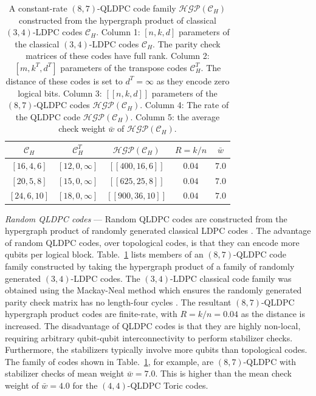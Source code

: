 \documentclass[%
 reprint,
superscriptaddress,
nofootinbib,
 amsmath,amssymb,
secnumarabic
]{revtex4-1}
\begin{document}
\begin{table} 
\renewcommand{\arraystretch}{1.2}

\begin{tabular}{c c | c c c}
	$\mathcal{C}_H$ & $\mathcal{C}_H^T$& $\mathcal{HGP}(\mathcal{C}_H)$ & $R=k/n$ & $\bar{w}$ \\ \hline
	$[16,4,6]$  & $[12,0,\infty]$ & $[[400,16,6]]$ & $0.04$ & $7.0$\\
	$[20,5,8]$  & $[15,0,\infty]$ & $[[625,25,8]]$ & $ 0.04$ & $7.0$\\
	$[24,6,10]$ & $[18,0,\infty]$ & $[[900,36,10]]$ & $0.04$ & $7.0$\\
\end{tabular}

\caption{A constant-rate $(8,7)$-QLDPC code family $\mathcal{HGP}(\mathcal{C}_H)$ constructed from the hypergraph product of classical $(3,4)$-LDPC codes $\mathcal{C}_H$. Column 1: $[n,k,d]$ parameters of the classical $(3,4)$-LDPC codes $\mathcal{C}_H$. The parity check matrices of these codes have full rank. Column 2: $[m,k^T,d^T]$ parameters of the transpose codes $\mathcal{C}_H^T$. The distance of these codes is set to $d^T=\infty$ as they encode zero logical bits. Column 3: $[[n,k,d]]$ parameters of the $(8,7)$-QLDPC codes $\mathcal{HGP}(\mathcal{C}_H)$. Column 4: The rate of the QLDPC code $\mathcal{HGP}(\mathcal{C}_H)$. Column 5: the average check weight $\bar{w}$ of $\mathcal{HGP}(\mathcal{C}_H)$.}
\label{tab:qldpc}

\end{table}


\textit{Random QLDPC codes} --- Random QLDPC codes are constructed from the hypergraph product of randomly generated classical LDPC codes \cite{kovalev2018numerical}. The advantage of random QLDPC codes, over topological codes, is that they can encode more qubits per logical block. Table.~\ref{tab:qldpc} lists members of an $(8,7)$-QLDPC code family constructed by taking the hypergraph product of a family of randomly generated $(3,4)$-LDPC codes. The $(3,4)$-LDPC classical code family was obtained using the Mackay-Neal method which ensures the randomly generated parity check matrix has no length-four cycles \cite{mackay1997near}. The resultant $(8,7)$-QLDPC hypergraph product codes are finite-rate, with $R=k/n=0.04$ as the distance is increased. The disadvantage of QLDPC codes is that they are highly non-local, requiring arbitrary qubit-qubit interconnectivity to perform stabilizer checks. Furthermore, the stabilizers typically involve more qubits than topological codes. The family of codes shown in Table.~\ref{tab:qldpc}, for example, are $(8,7)$-QLDPC with stabilizer checks of mean weight $\bar{w}=7.0$. This is higher than the mean check weight of $\bar{w}=4.0$ for the $(4,4)$-QLDPC Toric codes.
\end{document}
